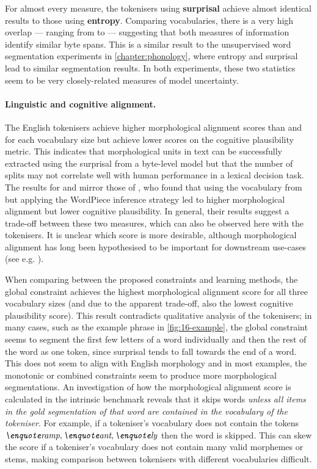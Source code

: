 For almost every measure, the tokenisers using \textbf{surprisal} achieve almost identical results to those using \textbf{entropy}. Comparing vocabularies, there is a very high overlap --- ranging from  to  --- suggesting that both measures of information identify similar byte spans. This is a similar result to the unsupervised word segmentation experiments in \cref{chapter:phonology}, where entropy and surprisal lead to similar segmentation results. In both experiments, these two statistics seem to be very closely-related measures of model uncertainty. %

\paragraph{Linguistic and cognitive alignment.}

The English \bytespan tokenisers achieve higher morphological alignment scores than \bpe and \bpewp for each vocabulary size but achieve lower scores on the cognitive plausibility metric. This indicates that morphological units in text can be successfully extracted using the surprisal from a byte-level model but that the number of splits may not correlate well with human performance in a lexical decision task. The results for \bpe and \bpewp mirror those of \citet{uzan-etal-2024-greed}, who found that using the vocabulary from \bpe but applying the WordPiece inference strategy led to higher morphological alignment but lower cognitive plausibility. In general, their results suggest a trade-off between these two measures, which can also be observed here with the \bytespan tokenisers. It is unclear which score is more desirable, although morphological alignment has long been hypothesised to be important for downstream use-cases (see e.g. \citet{gow-smith-etal-2022-improving}).

When comparing between the proposed constraints and learning methods, the global constraint achieves the highest morphological alignment score for all three vocabulary sizes (and due to the apparent trade-off, also the lowest cognitive plausibility score). This result contradicts qualitative analysis of the tokenisers; in many cases, such as the example phrase in \cref{fig:16-example}, the global constraint seems to segment the first few letters of a word individually and then the rest of the word as one token, since surprisal tends to fall towards the end of a word. This does not seem to align with English morphology and in most examples, the monotonic or combined constraints seem to produce more morphological segmentations. An investigation of how the morphological alignment score is calculated in the intrinsic benchmark reveals that it skips words \emph{unless all items in the gold segmentation of that word are contained in the vocabulary of the tokeniser}. For example, if a tokeniser's vocabulary does not contain the tokens \(\ex{ramp}, \ex{ant}, \ex{ly}\) then the word  is skipped. This can skew the score if a tokeniser's vocabulary does not contain many valid morphemes or stems, making comparison between tokenisers with different vocabularies difficult.

